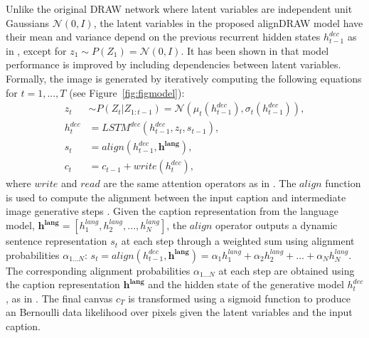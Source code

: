\documentclass{article} %
\newcommand{\hlang}{h^{lang}}
\newcommand{\hlangall}{\boldsymbol{h^{lang}}}
\newcommand{\hdec}{h^{dec}}
\newcommand{\readop}{\mathit{read}}
\newcommand{\writeop}{\mathit{write}}
\newcommand{\decoder}{\mathit{LSTM}^{dec}}
\newcommand{\canv}{c}
\newcommand{\lat}{z}
\newcommand{\Lat}{Z}
\newcommand{\prior}{P}
\begin{document}
Unlike the original DRAW network where latent variables are independent unit Gaussians $\mathcal{N}(0, I)$, the latent variables in the proposed alignDRAW model have their mean and variance depend on the previous recurrent hidden states $\hdec_{t-1}$ as in \cite{bachman_sdm}, except for $\lat_1 \sim \prior(\Lat_1) = \mathcal{N}(0, I)$. It has been shown in \citep{bachman_sdm} that model performance is improved by including dependencies between latent variables. Formally, the image is generated by iteratively computing the following equations for $t=1,...,T$ (see Figure~\ref{fig:figmodel}):
\begin{align}
\label{eq:x_hat}
\lat_t &\sim \prior(\Lat_t|\Lat_{1:t-1}) = \mathcal{N}(\mu_{t}(\hdec_{t-1}), \sigma_{t}(\hdec_{t-1})),\\
\hdec_t &= \decoder(\hdec_{t-1}, z_t, s_{t-1}), \\
s_{t} &= align(\hdec_{t-1}, \hlangall), \\
\canv_t &= \canv_{t-1} + \writeop(\hdec_t), 
\label{eq:write}
\end{align}
where $\writeop$ and $\readop$ are the same attention operators as in \citep{gregor_draw}.
The $align$ function is used to compute the alignment between the input caption and intermediate image generative steps \citep{bahdanau_mt}. Given the caption representation from the language model, $\hlangall = [\hlang_{1}, \hlang_{2}, ..., \hlang_{N}]$, the $align$ operator outputs a dynamic sentence representation $s_t$ at each step through a weighted sum using alignment probabilities $\alpha_{1...N}$:
$s_t=align(\hdec_{t-1}, \hlangall) = \alpha_{1}\hlang_{1} + \alpha_{2}\hlang_{2} + ... + \alpha_{N}\hlang_{N}.$
The corresponding alignment probabilities $\alpha_{1...N}$ at each step are obtained using the caption representation $\hlangall$ and the hidden state of the generative model $\hdec_{t}$, as in \citep{bahdanau_mt}. The final canvas $\canv_T$ is transformed using a sigmoid function to produce an Bernoulli data likelihood over pixels given the latent variables and the input caption.
\end{document}
